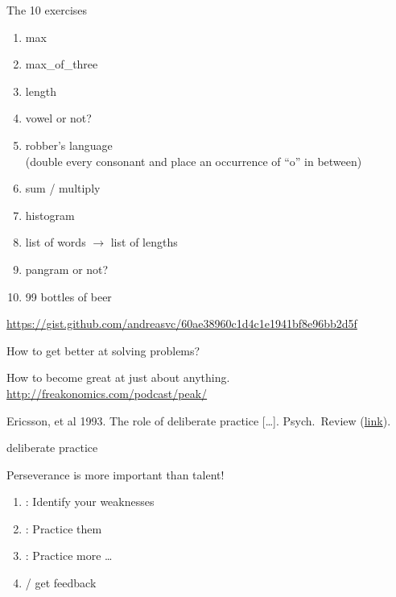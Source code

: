 \documentclass[aspectratio=169,usenames,dvipsnames]{beamer}
\begin{document}
\begin{frame}{The 10 exercises}
    \begin{enumerate}
        \item max
        \item max\_of\_three
        \item length
        \item vowel or not?
        \item robber's language \\
            (double every consonant and place an occurrence of ``o'' in between)
        \item sum / multiply
        \item histogram
        \item list of words $\rightarrow$ list of lengths
        \item pangram or not?
        \item 99 bottles of beer
    \end{enumerate}
    \url{https://gist.github.com/andreasvc/60ae38960c1d4c1e1941bf8e96bb2d5f}
\end{frame}

\begin{frame}{How to get better at solving problems?}
    \begin{reference}
        How to become great at just about anything. \url{http://freakonomics.com/podcast/peak/}

        Ericsson, et al 1993. The role of deliberate practice [\dots]. Psych.\ Review
        (\href{http://graphics8.nytimes.com/images/blogs/freakonomics/pdf/DeliberatePractice(PsychologicalReview).pdf}{link}).
    \end{reference}
    {\centering\Large 
    deliberate practice}

    \vspace{1em}
    Perseverance is more important than talent!

    \begin{enumerate}
        \item {}: Identify your weaknesses
        \item {}: Practice them
        \item {}: Practice more \dots
        \item {} / get feedback
    \end{enumerate}


\end{frame}
\end{document}
